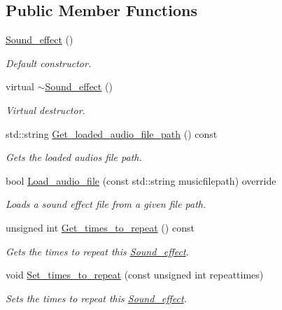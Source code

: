 \subsection*{Public Member Functions}
\begin{DoxyCompactItemize}
\item 
\hyperlink{classjetfuel_1_1media_1_1Sound__effect_a56c5c69d077a4cac1a062b391a9860fc}{Sound\+\_\+effect} ()
\begin{DoxyCompactList}\small\item\em Default constructor. \end{DoxyCompactList}\item 
virtual \hyperlink{classjetfuel_1_1media_1_1Sound__effect_a105547b1d854a256e90a08fcd6098bdf}{$\sim$\+Sound\+\_\+effect} ()
\begin{DoxyCompactList}\small\item\em Virtual destructor. \end{DoxyCompactList}\item 
std\+::string \hyperlink{classjetfuel_1_1media_1_1Sound__effect_ab172a8c2a1057970e343dfe81aeb208f}{Get\+\_\+loaded\+\_\+audio\+\_\+file\+\_\+path} () const
\begin{DoxyCompactList}\small\item\em Gets the loaded audio\textquotesingle{}s file path. \end{DoxyCompactList}\item 
bool \hyperlink{classjetfuel_1_1media_1_1Sound__effect_a1ad701cd2318e960bde2ab063aeabb75}{Load\+\_\+audio\+\_\+file} (const std\+::string musicfilepath) override
\begin{DoxyCompactList}\small\item\em Loads a sound effect file from a given file path. \end{DoxyCompactList}\item 
unsigned int \hyperlink{classjetfuel_1_1media_1_1Sound__effect_aa0fcc463543949dfe45efb41b8df93db}{Get\+\_\+times\+\_\+to\+\_\+repeat} () const
\begin{DoxyCompactList}\small\item\em Gets the times to repeat this \hyperlink{classjetfuel_1_1media_1_1Sound__effect}{Sound\+\_\+effect}. \end{DoxyCompactList}\item 
void \hyperlink{classjetfuel_1_1media_1_1Sound__effect_a79c40daad35fcce6cd7553747273f457}{Set\+\_\+times\+\_\+to\+\_\+repeat} (const unsigned int repeattimes)
\begin{DoxyCompactList}\small\item\em Sets the times to repeat this \hyperlink{classjetfuel_1_1media_1_1Sound__effect}{Sound\+\_\+effect}. \end{DoxyCompactList}\item 

\end{DoxyCompactItemize}
